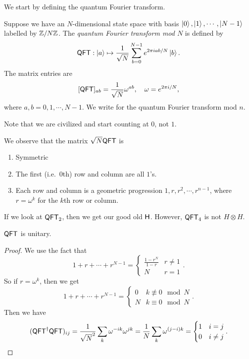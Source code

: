 We start by defining the quantum Fourier transform.
\begin{defi}
  Suppose we have an $N$-dimensional state space with basis $\left\lvert 0\right\rangle, \left\lvert 1\right\rangle, \cdots, \left\lvert N - 1\right\rangle$ labelled by $\mathbb{Z}/N\mathbb{Z}$. The \emph{quantum Fourier transform mod $N$} is defined by
  \[
    \mathsf{QFT}: \left\lvert a\right\rangle \mapsto \frac{1}{\sqrt{N}} \sum_{b = 0}^{N - 1} e^{2\pi i ab/N} \left\lvert b\right\rangle.
  \]
  The matrix entries are
  \[
    [\mathsf{QFT}]_{ab} = \frac{1}{\sqrt{N}} \omega^{ab},\quad \omega = e^{2\pi i/N},
  \]
  where $a, b = 0, 1, \cdots, N - 1$. We write  for the quantum Fourier transform mod $n$.
\end{defi}
Note that we are civilized and start counting at $0$, not $1$.

We observe that the matrix $\sqrt{N}\mathsf{QFT}$ is
\begin{enumerate}
  \item Symmetric
  \item The first (i.e.\ $0$th) row and column are all $1$'s.
  \item Each row and column is a geometric progression $1, r, r^2, \cdots, r^{n - 1}$, where $r = \omega^k$ for the $k$th row or column.
\end{enumerate}

\begin{eg}
  If we look at $\mathsf{QFT}_2$, then we get our good old $\mathsf{H}$. However, $\mathsf{QFT}_4$ is not $H \otimes H$.
\end{eg}

\begin{prop}
  $\mathsf{QFT}$ is unitary.
\end{prop}

\begin{proof}
  We use the fact that
  \[
    1 + r + \cdots + r^{N - 1} =
    \begin{cases}
      \frac{1 - r^N}{1 - r} & r \not= 1\\
      N & r = 1
    \end{cases}.
  \]
  So if $r = \omega^k$, then we get
  \[
    1 + r + \cdots + r^{N - 1} =
    \begin{cases}
      0 & k \not\equiv 0 \mod N\\
      N & k \equiv 0 \mod N
    \end{cases}.
  \]
  Then we have
  \[
    (\mathsf{QFT}^\dagger \mathsf{QFT})_{ij} = \frac{1}{\sqrt{N}^2} \sum_k \omega^{-ik} \omega^{jk} =\frac{1}{N} \sum_k \omega^{(j-i)k} =
    \begin{cases}
      1 & i = j\\
      0 & i \not= j
    \end{cases}.\qedhere
  \]
\end{proof}

